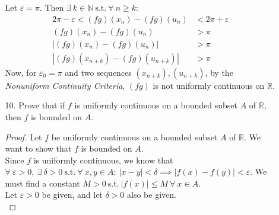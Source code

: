 \documentclass[12pt,letterpaper]{article}
\newcommand{\st}{\ \text{s.t.}\ }
\newcommand{\R}{\mathbb{R}}
\newcommand{\N}{\mathbb{N}}
\theoremstyle{case}
\theoremstyle{definition}
\begin{document}
\begin{enumerate}
\begin{enumerate}
			Let $\varepsilon=\pi$. Then $\exists\ k \in \N \st \forall\ n \geq k$:
			\begin{align*}
				2\pi - \varepsilon < (fg)(x_n)-(fg)(u_n) &< 2\pi + \varepsilon \\
				(fg)(x_n)-(fg)(u_n) &>\pi \\
				|(fg)(x_n) - (fg)(u_n)| &> \pi \\
				|(fg)(x_{n+k}) -(fg)(u_{n+k})| &> \pi
			\end{align*}
			Now, for $\varepsilon_0 = \pi$ and two sequences $(x_{n+k}), (u_{n+k})$, by the \textit{Nonuniform Continuity Criteria}, $(fg)$ is not uniformly continuous on $\R$.\\
			\item[10.] Prove that if $f$ is uniformly continuous on a bounded subset $A$ of $\R$, then $f$ is bounded on $A$.
			
			\begin{proof}
				Let $f$ be uniformly continuous on a bounded subset $A$ of $\R$. We want to show that $f$ is bounded on $A$.\\
				
				Since $f$ is uniformly continuous, we know that $\forall\ \varepsilon > 0,\ \exists\ \delta > 0 \st \forall\ x,y \in A;\ |x-y|<\delta \implies |f(x)-f(y)|<\varepsilon$. We must find a constant $M>0 \st |f(x)|\leq M\ \forall\ x \in A$.\\
				
				Let $\varepsilon>0$ be given, and let $\delta>0$ also be given.\\
				

\end{proof}
\end{enumerate}
\end{enumerate}
\end{document}
